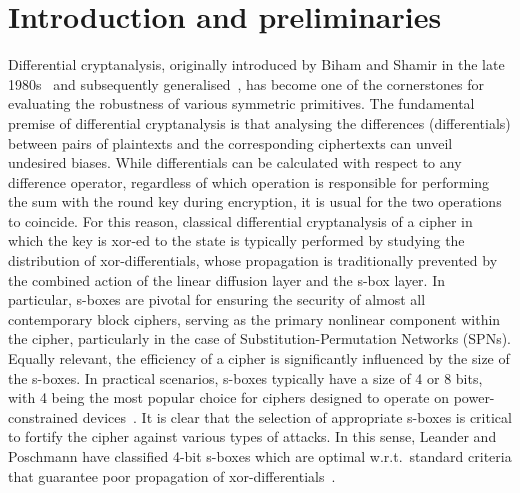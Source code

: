 \documentclass[runningheads,a4paper,english]{llncs}
\begin{document}
\section{Introduction and preliminaries}
Differential cryptanalysis, originally introduced by Biham and Shamir in the late 1980s~\cite{biham1991differential} and subsequently generalised~\cite{W99,K94,BCJW02,BBS99}, has become one of the cornerstones for evaluating the robustness of various symmetric primitives. The fundamental premise of differential cryptanalysis is that analysing the differences (differentials) between pairs of plaintexts and the corresponding ciphertexts can unveil undesired biases.
While  differentials can be calculated with respect to any difference operator, regardless of which operation is responsible for performing the sum with the round key during encryption, it is usual for the two operations to coincide.
For this reason, classical differential cryptanalysis of a cipher in which the key is xor-ed to the state is typically performed by studying the distribution of xor-differentials,
whose propagation is traditionally prevented by the combined action of the linear diffusion layer and the s-box layer. In particular,
s-boxes are pivotal for ensuring the security of almost all contemporary block ciphers, serving as the primary nonlinear component within the cipher, particularly in the case of Substitution-Permutation Networks (SPNs). Equally relevant, the efficiency of a cipher is significantly influenced by the size of the s-boxes. In practical scenarios, s-boxes typically have a size of 4 or 8 bits, with 4 being the most popular choice for ciphers designed to operate on power-constrained devices~\cite{biham1998serpent,bogdanov2007present,shibutani2011piccolo,banik2015midori}. It is clear that the selection of appropriate s-boxes is critical to fortify the cipher against various types of attacks. In this sense, Leander and Poschmann have classified 4-bit s-boxes which are optimal w.r.t.\ standard criteria that guarantee poor propagation of xor-differentials~\cite{leander2007classification}.
\end{document}
